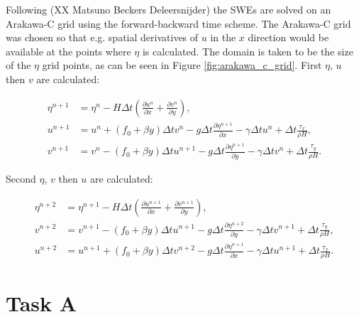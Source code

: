 \documentclass{article}
\begin{document}
Following (XX Matsuno Beckers Deleersnijder) the SWEs are solved on an Arakawa-C grid using the
forward-backward time scheme. The Arakawa-C grid was chosen so that e.g. spatial derivatives of $u$
in the $x$ direction would be available at the points where $\eta$ is calculated. The domain is
taken to be the size of the $\eta$ grid points, as can be seen in Figure \ref{fig:arakawa_c_grid}.
First $\eta$, $u$ then $v$ are calculated:

\begin{align}
    \label{eqn:swe_arakawa1} 
    \eta^{n+1} & =  \eta^n- H \Delta t (\frac{\partial u^n}{\partial x} + \frac{\partial v^n}{\partial y} ),  \\
    \label{eqn:swe_arakawa2} 
    u^{n+1} & = u^n + (f_0 + \beta y) \Delta t v^n - g \Delta t \frac{\partial \eta^{n+1}}{\partial
    x} - \gamma \Delta t u^n + \Delta t \frac{\tau_x}{\rho H}, \\
    \label{eqn:swe_arakawa3} 
    v^{n+1} & = v^n - (f_0 + \beta y) \Delta t u^{n+1} - g \Delta t \frac{\partial \eta^{n+1}}{\partial y} -
    \gamma \Delta t v^n + \Delta t \frac{\tau_y}{\rho H}.
\end{align}

Second $\eta$, $v$ then $u$ are calculated:

\begin{align}
    \label{eqn:swe_arakawa4} 
    \eta^{n+2} & =  \eta^{n+1}- H \Delta t (\frac{\partial u^{n+1}}{\partial x} + \frac{\partial
    v^{n+1}}{\partial y} ),  \\
    \label{eqn:swe_arakawa5} 
    v^{n+2} & = v^{n+1} - (f_0 + \beta y) \Delta t u^{n+1} - g \Delta t \frac{\partial \eta^{n+2}}{\partial y} -
    \gamma \Delta t v^{n+1} + \Delta t \frac{\tau_y}{\rho H}, \\
    \label{eqn:swe_arakawa6} 
    u^{n+2} & = u^{n+1} + (f_0 + \beta y) \Delta t v^{n+2} - g \Delta t \frac{\partial
	\eta^{n+1}}{\partial x} - \gamma \Delta t u^{n+1} + \Delta t \frac{\tau_x}{\rho H}.
\end{align}



\section*{Task A}
\end{document}
